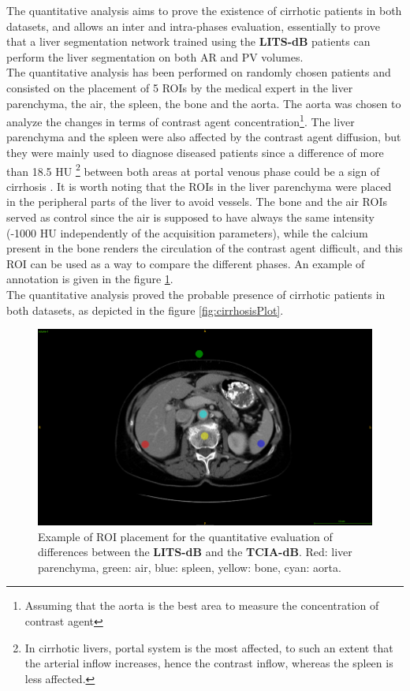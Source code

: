 \documentclass[]{article}
\newcommand{\lmttfont}[1]{{\fontfamily{lmtt}\selectfont #1}}
\begin{document}
The quantitative analysis aims to prove the existence of cirrhotic patients in both datasets, and allows an inter and intra-phases evaluation, essentially to prove that a liver segmentation network trained using the \textbf{\lmttfont{LITS-dB}} patients can perform the liver segmentation on both AR and PV volumes. \\
The quantitative analysis has been performed on randomly chosen patients and consisted on the placement of 5 ROIs by the medical expert in the liver parenchyma, the air, the spleen, the bone and the aorta. The aorta was chosen to analyze the changes in terms of contrast agent concentration\footnote{Assuming that the aorta is the best area to measure the concentration of contrast agent}. The liver parenchyma and the spleen were also affected by the contrast agent diffusion, but they were mainly used to diagnose diseased patients since a difference of more than 18.5 HU \footnote{In cirrhotic livers, portal system is the most affected, to such an extent that the arterial inflow increases, hence the contrast inflow, whereas the spleen is less affected.} between both areas at portal venous phase could be a sign of cirrhosis \cite{Wells2016}. It is worth noting that the ROIs in the liver parenchyma were placed in the peripheral parts of the liver to avoid vessels. The bone and the air ROIs served as control since the air is supposed to have always the same intensity (-1000 HU independently of the acquisition parameters), while the calcium present in the bone renders the circulation of the contrast agent difficult, and this ROI can be used as a way to compare the different phases. An example of annotation is given in the figure \ref{fig:roiPlacement}. \\
The quantitative analysis proved the probable presence of cirrhotic patients in both datasets, as depicted in the figure \ref{fig:cirrhosisPlot}.
\begin{figure}[!ht]
	\centering
	\includegraphics[width=0.6\linewidth]{../Contributions/images/Resizejuan_Roi_Example}
	\caption{Example of ROI placement for the quantitative evaluation of differences between the \textbf{\lmttfont{LITS-dB}} and the \textbf{\lmttfont{TCIA-dB}}. Red: liver parenchyma, green: air, blue: spleen, yellow: bone, cyan: aorta.}
	\label{fig:roiPlacement}
\end{figure}
\end{document}
